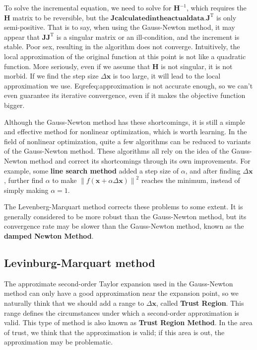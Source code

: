 To solve the incremental equation, we need to solve for $\bm{H}^{-1}$, which requires the $\bm{H}$ matrix to be reversible, but the $\bm{J} \bm{ calculated in the actual data. J}^\mathrm{T}$ is only semi-positive. That is to say, when using the Gauss-Newton method, it may appear that $\bm{J}\bm{J}^\mathrm{T}$ is a singular matrix or an ill-condition, and the increment is stable. Poor sex, resulting in the algorithm does not converge. Intuitively, the local approximation of the original function at this point is not like a quadratic function. More seriously, even if we assume that $\bm{H}$ is not singular, it is not morbid. If we find the step size $\Delta \bm{x}$ is too large, it will lead to the local approximation we use. Eqref{eq:approximation} is not accurate enough, so we can't even guarantee its iterative convergence, even if it makes the objective function bigger.

Although the Gauss-Newton method has these shortcomings, it is still a simple and effective method for nonlinear optimization, which is worth learning. In the field of nonlinear optimization, quite a few algorithms can be reduced to variants of the Gauss-Newton method. These algorithms all rely on the idea of ​​the Gauss-Newton method and correct its shortcomings through its own improvements. For example, some \textbf{line search method} added a step size of $\alpha$, and after finding $\Delta \bm{x}$, further find $\alpha$ to make $\left\| f (\bm{x} + \alpha \Delta \bm{ x}) \right\|^2$ reaches the minimum, instead of simply making $\alpha = 1$.

The Levenberg-Marquart method corrects these problems to some extent. It is generally considered to be more robust than the Gauss-Newton method, but its convergence rate may be slower than the Gauss-Newton method, known as the \textbf{damped Newton Method}.

\subsection{Levinburg-Marquart method}
The approximate second-order Taylor expansion used in the Gauss-Newton method can only have a good approximation near the expansion point, so we naturally think that we should add a range to $\Delta \bm{x}$, called \textbf{ Trust Region}. This range defines the circumstances under which a second-order approximation is valid. This type of method is also known as \textbf{Trust Region Method}. In the area of ​​trust, we think that the approximation is valid; if this area is out, the approximation may be problematic.

